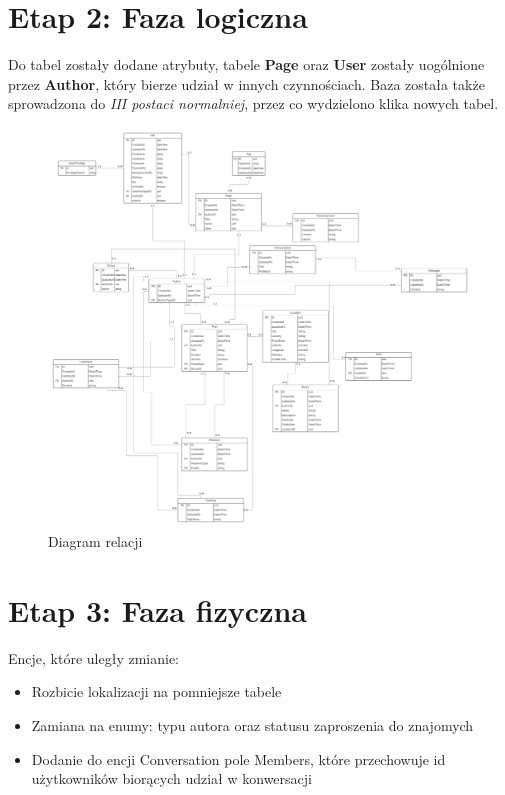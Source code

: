 \documentclass{article}
\begin{document}
\section{Etap 2: Faza logiczna}

Do tabel zostały dodane atrybuty, tabele \textbf{Page} oraz \textbf{User} zostały uogólnione przez \textbf{Author}, który bierze udział w innych czynnościach. Baza została także sprowadzona do \textit{III postaci normalniej}, przez co wydzielono klika nowych tabel. 

\begin{figure}[H]
    \centering
    \includegraphics[width=\linewidth]{images/rel.png}
    \caption{Diagram relacji}
    \label{fig:rel}
\end{figure}

\section{Etap 3: Faza fizyczna}

Encje, które uległy zmianie:

\begin{itemize}
    \item Rozbicie lokalizacji na pomniejsze tabele
    \item Zamiana na enumy: typu autora oraz statusu zaproszenia do znajomych
    \item Dodanie do encji Conversation pole Members, które przechowuje id użytkowników biorących udział w konwersacji
\end{itemize}
\end{document}
